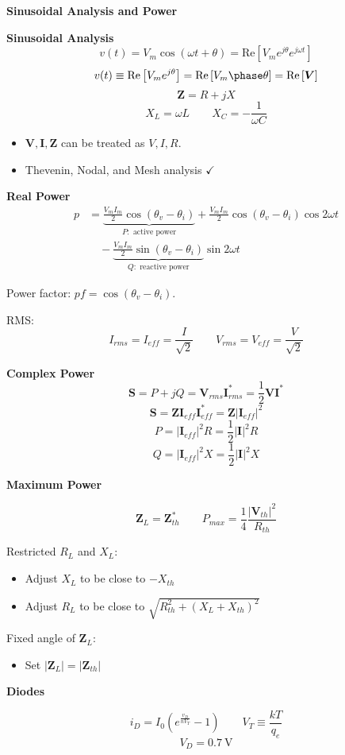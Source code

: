 \documentclass[10pt]{article}
\newcommand{\bv}{\boldsymbol}
\newcommand{\V}{\bv V}
\newcommand{\I}{\bv I}
\newcommand{\Z}{\bv Z}
\renewcommand{\S}{\bv S}
\renewcommand{\Re}[1]{\mathrm{Re}\sqb{#1}}
\newcommand{\conj}{^*}
\newcommand{\norm}[1]{\left\lvert #1 \right\rvert}
\newcommand{\lrb}[1]{\left(#1\right)}
\newcommand{\sqb}[1]{\left[#1\right]}
\newcommand\sectionheading[1]{\begin{center}\large{\textbf{#1}}\end{center}\normalsize}
\newcommand\heading[1]{\textbf{#1}}
\begin{document}
\begin{multicols*}{3}
\sectionheading{Sinusoidal Analysis and Power}
\heading{Sinusoidal Analysis}
\[v(t)=V_m\cos(\omega t+\theta)=\Re{V_me^{j\theta}e^{j\omega t}}\]
\[v(t)\equiv\Re{V_me^{j\theta}}=\Re{V_m\phase\theta}=\Re{\V}\]
\[\Z=R+jX\]
\[X_L=\omega L \qquad X_C=-\frac{1}{\omega C}\]
\begin{itemize}[topsep=0pt,noitemsep]
    \item $\V,\I,\Z$ can be treated as $V,I,R$.
    \item Thevenin, Nodal, and Mesh analysis $\checkmark$
\end{itemize}

\heading{Real Power}
\begin{align*}
    p&=\underbrace{\frac{V_mI_m}{2}\cos(\theta_v-\theta_i)}_{P:\text{ active power}}+\frac{V_mI_m}{2}\cos(\theta_v-\theta_i)\cos 2\omega t \\
    &\hspace{1em}-\underbrace{\frac{V_mI_m}{2}\sin(\theta_v-\theta_i)}_{Q:\text{ reactive power}} \sin 2\omega t
\end{align*}

Power factor: $pf=\cos(\theta_v-\theta_i)$.

RMS:
\[I_{rms}=I_{eff}=\frac{I}{\sqrt 2} \qquad V_{rms}=V_{eff}=\frac{V}{\sqrt 2}\]

\heading{Complex Power}
\[\S=P+jQ=\V_{rms}\I\conj_{rms}=\frac 12\V\I\conj\]
\[\S=\Z\I_{eff}\I\conj_{eff}=\Z\norm{\I_{eff}}^2\]
\[P=\norm{\I_{eff}}^2R=\frac 12\norm{\I}^2R\]
\[Q=\norm{\I_{eff}}^2X=\frac 12\norm{\I}^2X\]

\heading{Maximum Power}

\[\Z_L=\Z\conj_{th} \qquad P_{max}=\frac 14\frac{\norm{\V_{th}}^2}{R_{th}}\]

Restricted $R_L$ and $X_L$:
\begin{itemize}[topsep=0pt,noitemsep]
    \item Adjust $X_L$ to be close to $-X_{th}$
    \item Adjust $R_L$ to be close to $\sqrt{R_{th}^2+(X_L+X_{th})^2}$
\end{itemize}
Fixed angle of $\Z_L$:
\begin{itemize}[topsep=0pt,noitemsep]
    \item Set $\norm{\Z_L}=\norm{\Z_{th}}$
\end{itemize}

\heading{Diodes}

\[i_D=I_0\lrb{e^{\frac{v_D}{nV_T}}-1} \qquad V_T\equiv\frac{kT}{q_e}\]
\[V_D=\SI{0.7}{\volt}\]


\end{multicols*}
\end{document}

